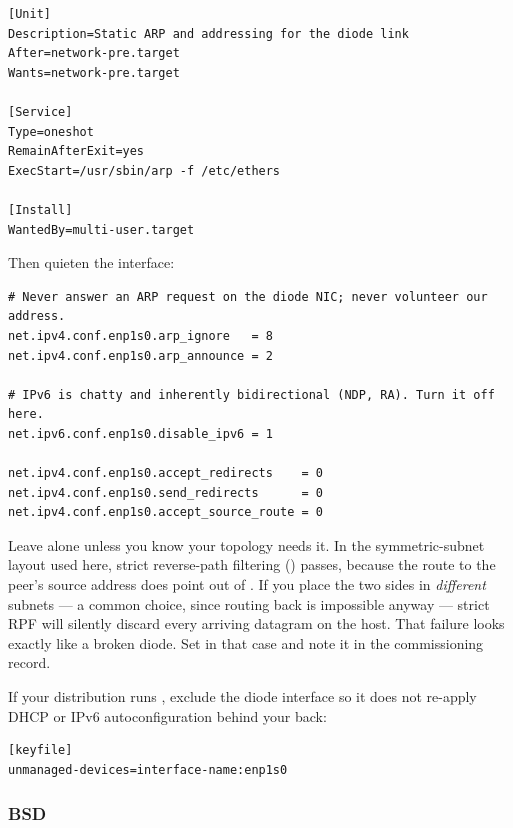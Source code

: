 \documentclass[11pt,a4paper]{article}
\begin{document}
\begin{lstlisting}[style=conf,caption={\file{/etc/systemd/system/diode-link.service}}]
[Unit]
Description=Static ARP and addressing for the diode link
After=network-pre.target
Wants=network-pre.target

[Service]
Type=oneshot
RemainAfterExit=yes
ExecStart=/usr/sbin/arp -f /etc/ethers

[Install]
WantedBy=multi-user.target
\end{lstlisting}

Then quieten the interface:

\begin{lstlisting}[style=conf,caption={\file{/etc/sysctl.d/90-diode.conf}}]
# Never answer an ARP request on the diode NIC; never volunteer our address.
net.ipv4.conf.enp1s0.arp_ignore   = 8
net.ipv4.conf.enp1s0.arp_announce = 2

# IPv6 is chatty and inherently bidirectional (NDP, RA). Turn it off here.
net.ipv6.conf.enp1s0.disable_ipv6 = 1

net.ipv4.conf.enp1s0.accept_redirects    = 0
net.ipv4.conf.enp1s0.send_redirects      = 0
net.ipv4.conf.enp1s0.accept_source_route = 0
\end{lstlisting}

\begin{warnbox}
Leave  alone unless you know your topology needs it. In the
symmetric-subnet layout used here, strict reverse-path filtering
() passes, because the route to the peer's source address
does point out of . If you place the two sides in \emph{different}
subnets --- a common choice, since routing back is impossible anyway --- strict
RPF will silently discard every arriving datagram on the \dstside{} host.
That failure looks exactly like a broken diode. Set
 in that case and note it in the
commissioning record.
\end{warnbox}

If your distribution runs , exclude the diode interface
so it does not re-apply DHCP or IPv6 autoconfiguration behind your back:

\begin{lstlisting}[style=conf,caption={\file{/etc/NetworkManager/conf.d/90-diode.conf}}]
[keyfile]
unmanaged-devices=interface-name:enp1s0
\end{lstlisting}

\subsubsection{BSD}
\end{document}

